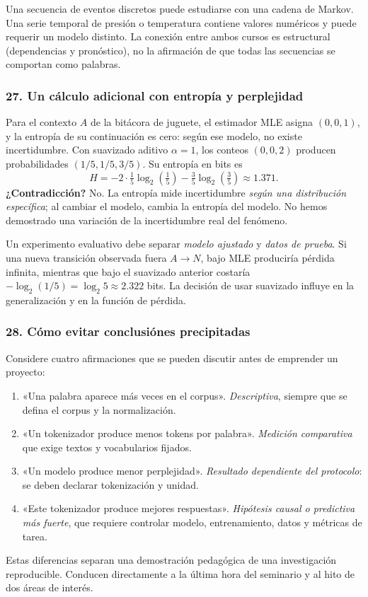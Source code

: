 \begin{idea}
Una secuencia de eventos discretos puede estudiarse con una cadena de Markov. Una serie temporal de presión o temperatura contiene valores numéricos y puede requerir un modelo distinto. La conexión entre ambos cursos es estructural (dependencias y pronóstico), no la afirmación de que todas las secuencias se comportan como palabras.
\end{idea}

\subsubsection*{27. Un cálculo adicional con entropía y perplejidad}
Para el contexto $A$ de la bitácora de juguete, el estimador MLE asigna $(0,0,1)$, y la entropía de su continuación es cero: según ese modelo, no existe incertidumbre. Con suavizado aditivo $\alpha=1$, los conteos $(0,0,2)$ producen probabilidades $(1/5,1/5,3/5)$. Su entropía en bits es
\[
H=-2\cdot\tfrac15\log_2(\tfrac15)-\tfrac35\log_2(\tfrac35)\approx1.371.
\]
\textbf{¿Contradicción?} No. La entropía mide incertidumbre \emph{según una distribución específica}; al cambiar el modelo, cambia la entropía del modelo. No hemos demostrado una variación de la incertidumbre real del fenómeno.

Un experimento evaluativo debe separar \emph{modelo ajustado} y \emph{datos de prueba}. Si una nueva transición observada fuera $A\to N$, bajo MLE produciría pérdida infinita, mientras que bajo el suavizado anterior costaría $-\log_2(1/5)=\log_2 5\approx2.322$ bits. La decisión de usar suavizado influye en la generalización y en la función de pérdida.

\subsubsection*{28. Cómo evitar conclusiónes precipitadas}
Considere cuatro afirmaciones que se pueden discutir antes de emprender un proyecto:
\begin{enumerate}
\item «Una palabra aparece más veces en el corpus». \emph{Descriptiva}, siempre que se defina el corpus y la normalización.
\item «Un tokenizador produce menos tokens por palabra». \emph{Medición comparativa} que exige textos y vocabularios fijados.
\item «Un modelo produce menor perplejidad». \emph{Resultado dependiente del protocolo}: se deben declarar tokenización y unidad.
\item «Este tokenizador produce mejores respuestas». \emph{Hipótesis causal o predictiva más fuerte}, que requiere controlar modelo, entrenamiento, datos y métricas de tarea.
\end{enumerate}
Estas diferencias separan una demostración pedagógica de una investigación reproducible. Conducen directamente a la última hora del seminario y al hito de dos áreas de interés.
\clearpage

